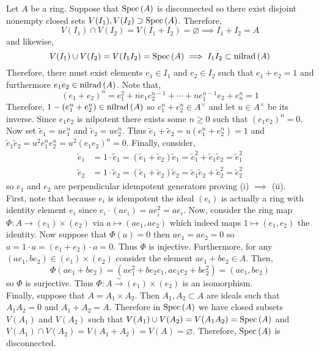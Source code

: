 \documentclass[12pt]{article}
\begin{document}
Let $A$ be a ring. Suppose that $\mathrm{Spec}\left( A \right)$ is disconnected so there exist disjoint nonempty closed sets $V(I_1), V(I_2) \supset \mathrm{Spec}\left( A \right)$. Therefore, 
\[ V(I_1) \cap V(I_2) = V(I_1 + I_2) = \varnothing \implies I_1 + I_2 = A \]
and likewise,
\[ V(I_1) \cup V(I_2) = V(I_1 I_2) = \mathrm{Spec}\left( A \right) \implies I_1 I_2 \subset \mathrm{nilrad}\left( A \right) \]
Therefore, there must exist elements $e_1 \in I_1$ and $e_2 \in I_2$ such that $e_1 + e_2 = 1$ and furthermore $e_1 e_2 \in \mathrm{nilrad}\left( A \right)$. Note that,
\[ (e_1 + e_2)^n = e_1^2 + n e_1 e_2^{n-1} + \cdots + n e_1^{n-1} e_2 + e_n^n = 1 \]
Therefore, $1 - (e_1^n + e_2^n) \in \mathrm{nilrad}\left( A \right)$ so $e_1^n  + e_2^n \in A^\times$ and let $u \in A^\times$ be its inverse. Since $e_1 e_2$ is nilpotent there exists some $n \ge 0$ such that $(e_1 e_2)^n = 0$. Now set $\tilde{e}_1 = u e_1^n$ and $\tilde{e}_2 = u e_2^n$. Thus $\tilde{e}_1 + \tilde{e}_2 = u(e_1^n + e_2^n) = 1$ and $\tilde{e}_1 \tilde{e}_2 = u^2 e_1^n e_2^n = u^2 (e_1 e_2)^n = 0$. Finally, consider,
\begin{align*}
\tilde{e}_1 & = 1 \cdot \tilde{e}_1 = (\tilde{e}_1 + \tilde{e}_2) \tilde{e}_1 = \tilde{e}_1^2 + \tilde{e}_1 \tilde{e}_2 = \tilde{e}_1^2
\\
\tilde{e}_2 & = 1 \cdot \tilde{e}_2 = (\tilde{e}_1 + \tilde{e}_2) \tilde{e}_2 = \tilde{e}_1 \tilde{e}_2 + \tilde{e}_2^2 = \tilde{e}_2^2
\end{align*}
so $e_1$ and $e_2$ are perpendicular idempotent generators proving (i) $\implies$ (ii). 
\bigskip\\
First, note that because $e_i$ is idempotent the ideal $(e_i)$ is actually a ring with identity element $e_i$ since $e_i \cdot (a e_i) = a e_i^2 = a e_i$. Now, consider the ring map $\Phi : A \to (e_1) \times (e_2)$ via $a \mapsto (a e_1, a e_2)$ which indeed maps $1 \mapsto (e_1, e_2)$ the identity. Now suppose that $\Phi(a) = 0$ then $a e_1 = a e_2 = 0$ so $a = 1 \cdot a = (e_1 + e_2) \cdot a = 0$. Thus $\Phi$ is injective. Furthermore, for any $(a e_1, b e_2) \in (e_1) \times (e_2)$ consider the element $a e_1 + b e_2 \in A$. Then, 
\[ \Phi(a e_1 + b e_2) = (a e_1^2 + b e_2 e_1, a e_1 e_2 + b e_2^2) = (a e_1, b e_2) \]
so $\Phi$ is surjective. Thus $\Phi : A \xrightarrow{\sim} (e_1) \times (e_2)$ is an isomorphism.
\bigskip\\
Finally, suppose that $A = A_1 \times A_2$. Then $A_1, A_2 \subset A$ are ideals such that $A_1 A_2 = 0$ and $A_1 + A_2 = A$. Therefore in $\mathrm{Spec}\left( A \right)$ we have closed subsets $V(A_1)$ and $V(A_2)$ such that $V(A_1) \cup V(A_2) = V(A_1 A_2) = \mathrm{Spec}\left( A \right)$ and $V(A_1) \cap V(A_2) = V(A_1 + A_2) = V(A) = \varnothing$. Therefore, $\mathrm{Spec}\left( A \right)$ is disconnected. 
\end{document}
